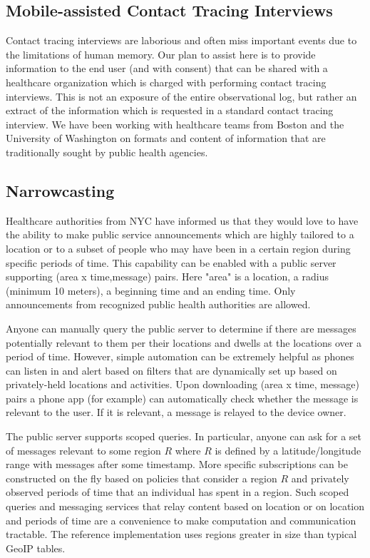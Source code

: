 \documentclass{article}
\begin{document}
\subsection{Mobile-assisted Contact Tracing Interviews} 
Contact tracing interviews are laborious and often miss important events due to the limitations of human memory.  Our plan to assist here is to provide information to the end user (and with consent) that can be shared with a healthcare organization which is charged with performing contact tracing interviews.   This is not an exposure of the entire observational log, but rather an extract of the information which is requested in a standard contact tracing interview. We have been working with healthcare teams from Boston and the University of Washington on formats and content of information that are traditionally sought by public health agencies.

\subsection{Narrowcasting}

Healthcare authorities from NYC have informed us that they would love to have the ability to make public service announcements which are highly tailored to a location or to a subset of people who may have been in a certain region during specific periods of time.  This capability can be enabled with a public server supporting (area x time,message) pairs.  Here "area" is a location, a radius (minimum 10 meters), a beginning time and an ending time.  Only announcements from recognized public health authorities are allowed.  

Anyone can manually query the public server to determine if there are messages potentially relevant to them per their locations and dwells at the locations over a period of time. However, simple automation can be extremely helpful as phones can listen in and alert based on filters that are dynamically set up based on privately-held locations and activities. Upon downloading (area x time, message) pairs a phone app (for example) can automatically check whether the message is relevant to the user.  If it is relevant, a message is relayed to the device owner.

The public server supports scoped queries.  In particular, anyone can ask for a set of messages relevant to some region $R$ where $R$ is defined by a latitude/longitude range with messages after some timestamp.  More specific subscriptions can be constructed on the fly based on policies that consider a region $R$ and privately observed periods of time that an individual has spent in a region. Such scoped queries and messaging services that relay content based on location or on location and periods of time are a convenience to make computation and communication tractable.  The reference implementation uses regions greater in size than typical GeoIP tables.
\end{document}
